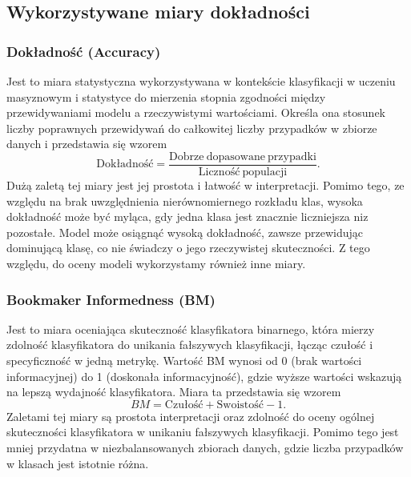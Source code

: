 \documentclass[12pt]{article}
\begin{document}
	\subsection{Wykorzystywane miary dokładności}\label{subsec:miary-dokladnosci}
	
	\subsubsection{Dokładność (Accuracy)}
	Jest to miara statystyczna wykorzystywana w kontekście klasyfikacji w uczeniu masyznowym i statystyce do mierzenia stopnia zgodności między przewidywaniami modelu a rzeczywistymi wartościami. Określa ona stosunek liczby poprawnych przewidywań do całkowitej liczby przypadków w zbiorze danych i przedstawia się wzorem 
	\[\mathrm{Dokładność} = \frac{\mathrm{Dobrze~dopasowane~przypadki}}{\mathrm{Liczność~populacji}}.\] 
	Dużą zaletą tej miary jest jej prostota i łatwość w interpretacji. Pomimo tego, ze względu na brak uwzględnienia nierównomiernego rozkładu klas, wysoka dokładność może być myląca, gdy jedna klasa jest znacznie liczniejsza niz pozostałe. Model może osiągnąć wysoką dokładność, zawsze przewidując dominującą klasę, co nie świadczy o jego rzeczywistej skuteczności. Z tego względu, do oceny modeli wykorzystamy również inne miary.
	
	\subsubsection{Bookmaker Informedness (BM)}
	Jest to miara oceniająca skuteczność klasyfikatora binarnego, która mierzy zdolność klasyfikatora do unikania fałszywych klasyfikacji, łącząc czułość i specyficzność w jedną metrykę. Wartość BM wynosi od 0 (brak wartości informacyjnej) do 1 (doskonała informacyjność), gdzie wyższe wartości wskazują na lepszą wydajność klasyfikatora. Miara ta przedstawia się wzorem
	\[BM = \mathrm{Czułość} + \mathrm{Swoistość} - 1.\] 
	Zaletami tej miary są prostota interpretacji oraz zdolność do oceny ogólnej skuteczności klasyfikatora w unikaniu fałszywych klasyfikacji. Pomimo tego jest mniej przydatna w niezbalansowanych zbiorach danych, gdzie liczba przypadków w klasach jest istotnie różna.
	
\end{document}
